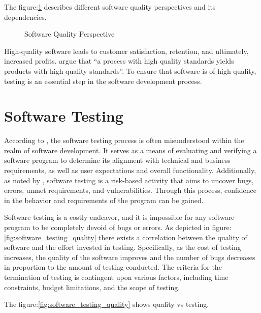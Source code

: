 The figure:\ref{fig:software_quality_perspective} describes different software quality perspectives
and its dependencies.

\begin{figure}[h]
\centering
{}
\caption{Software Quality Perspective}\label{fig:software_quality_perspective}
\end{figure}


High-quality software leads to customer satisfaction, retention, and ultimately, increased profits.
\citeauthor{8748529} argue that ``a process with high quality standards yields products with high
quality standards''.
To ensure that software is of high quality, testing is an essential step in the software development
process\cite{8748529}.

\section{Software Testing}

According to \citeauthor{whittaker2000software}, the software testing process is often misunderstood
within the realm of software development\cite{whittaker2000software}. It serves as a means of
evaluating and verifying a software program to determine its alignment with technical and business
requirements, as well as user expectations and overall functionality\cite{bentley2005software}.
Additionally, as noted by \citeauthor{jamil2016software}, software testing is a risk-based activity
that aims to uncover bugs, errors, unmet requirements, and vulnerabilities. Through this process,
confidence in the behavior and requirements of the program can be gained\cite{jamil2016software}.


Software testing is a costly endeavor, and it is impossible for any software program to be completely
devoid of bugs or errors. As depicted in figure:\ref{fig:software_testing_quality} there exists a
correlation between the quality of software and the effort invested in testing. Specifically,
as the cost of testing increases, the quality of the software improves and the number of bugs
decreases in proportion to the amount of testing conducted. The criteria for the termination of
testing is contingent upon various factors, including time constraints, budget limitations, and the
scope of testing.

The figure:\ref{fig:software_testing_quality} shows quality vs testing.

